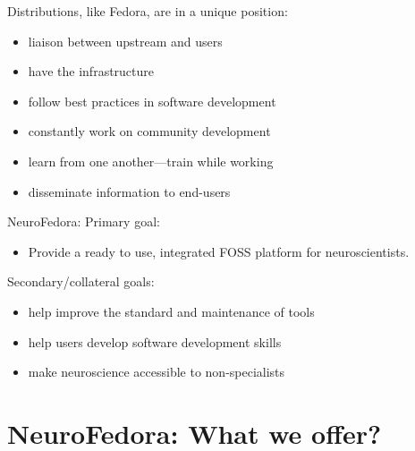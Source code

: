 \begin{frame}[c]{Distributions, like Fedora, are in a unique position:}
	\begin{itemize}
		\item \alert{liaison between upstream and users}
		\item have the \alert{infrastructure}
		\item \alert{follow best practices} in software development
		\item constantly \alert{work on community development}
		\item \alert{learn from one another}---train while working
		\item \alert{disseminate} information to end-users
	\end{itemize}
\end{frame}

\begin{frame}[c]{NeuroFedora:}
	\textcolor{FedoraBlue}{Primary goal:}
	\begin{itemize}
		\item Provide a \alert{ready to use, integrated FOSS platform} for neuroscientists\footnotemark[7].
	\end{itemize}
	\textcolor{FirstGreen}{Secondary/collateral goals:}
	\begin{itemize}
		\item help \alert{improve the standard and maintenance} of tools
		\item help users \alert{develop software development skills}
		\item \alert{make neuroscience accessible} to non-specialists
	\end{itemize}
\end{frame}

\section{NeuroFedora: What we offer?}

